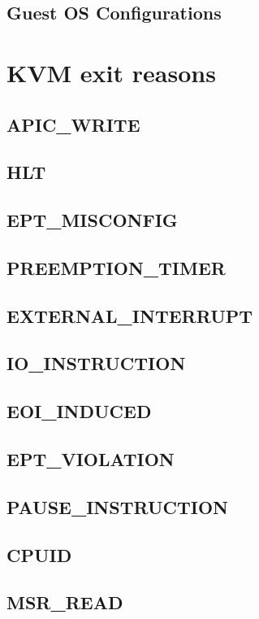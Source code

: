 \documentclass[MMR,Master,english]{twbook}
\begin{document}
\clearpage
\section{Guest OS Configurations}

\clearpage

\chapter{KVM exit reasons}\label{cha:kvm_exit_reasons}

\section{APIC\_WRITE}
\section{HLT}
\section{EPT\_MISCONFIG}
\section{PREEMPTION\_TIMER}
\section{EXTERNAL\_INTERRUPT}
\section{IO\_INSTRUCTION}
\section{EOI\_INDUCED}
\section{EPT\_VIOLATION}
\section{PAUSE\_INSTRUCTION}
\section{CPUID}
\section{MSR\_READ}
\end{document}
